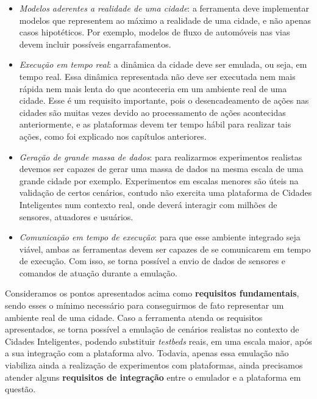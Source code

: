 \begin{itemize}
    \item \textit{Modelos aderentes a realidade de uma cidade}: a ferramenta deve implementar modelos que representem ao máximo a realidade de uma cidade, e não apenas casos hipotéticos.
        Por exemplo, modelos de fluxo de automóveis nas vias devem incluir possíveis engarrafamentos.

    \item \textit{Execução em tempo real}: a dinâmica da cidade deve ser emulada, ou seja, em tempo real. Essa dinâmica representada não deve ser executada nem mais rápida nem mais lenta do que
        aconteceria em um ambiente real de uma cidade.
        Esse é um requisito importante, pois o desencadeamento de ações nas cidades são muitas vezes devido ao processamento de ações acontecidas anteriormente, e as plataformas
        devem ter tempo hábil para realizar tais ações, como foi explicado nos capítulos anteriores.

    \item \textit{Geração de grande massa de dados}: para realizarmos experimentos realistas devemos ser capazes de gerar uma massa de dados na mesma escala de uma grande cidade por
        exemplo.
        Experimentos em escalas menores são úteis na validação de certos cenários, contudo não exercita uma plataforma de Cidades Inteligentes num contexto real, onde deverá
        interagir com milhões de sensores, atuadores e usuários.

    \item \textit{Comunicação em tempo de execução}: para que esse ambiente integrado seja viável, ambas as ferramentas devem ser capazes de se comunicarem em tempo de execução.
        Com isso, se torna possível a envio de dados de sensores e comandos de atuação durante a emulação.
\end{itemize}

Consideramos os pontos apresentados acima como \textbf{requisitos fundamentais}, sendo esses o mínimo necessário para conseguirmos de fato representar um ambiente real de uma cidade.
Caso a ferramenta atenda os requisitos apresentados, se torna possível a emulação de cenários realistas no contexto de Cidades Inteligentes, podendo substituir \textit{testbeds}
reais, em uma escala maior, após a sua integração com a plataforma alvo.
Todavia, apenas essa emulação não viabiliza ainda a realização de experimentos com plataformas, ainda precisamos atender alguns \textbf{requisitos de integração} entre o emulador
e a plataforma em questão.

